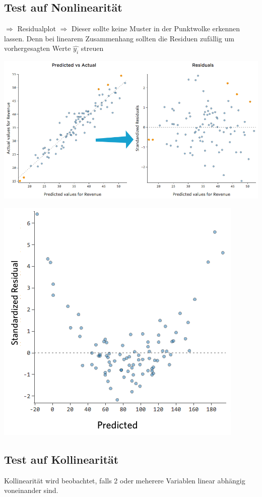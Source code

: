 \subsection{Test auf Nonlinearität}
$\Rightarrow$ Residualplot
$\Rightarrow$ Dieser sollte keine Muster in der Punktwolke erkennen lassen. Denn bei linearem Zusammenhang sollten die Residuen zufällig um vorhergesagten Werte $\hat{y_i}$ streuen

\includegraphics[scale=0.4]{VorlesungenTexDateien/images/residual}
       
\includegraphics[scale=0.5]{VorlesungenTexDateien/images/Nonlinear-residual-11}

\subsection{Test auf Kollinearität}
Kollinearität wird beobachtet, falls 2 oder meherere Variablen linear abhängig voneinander sind.


